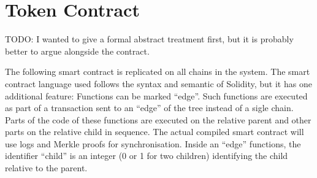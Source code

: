 \documentclass[11pt,letterpaper]{article}
\newtheorem{property}[dummytheorem]{Property}
\begin{document}
\section{Token Contract}

TODO: I wanted to give a formal abstract treatment first,
but it is probably better to argue alongside the contract.






The following smart contract is replicated on all chains in
the system. The smart contract language used follows
the syntax and semantic of Solidity, but it has
one additional feature: Functions can be marked ``edge''.
Such functions
are executed as part of a transaction sent to an ``edge''
of the tree instead of a sigle chain. Parts of the code of these functions
are executed on the relative parent and other parts on
the relative child in sequence. The actual compiled smart contract
will use logs and Merkle proofs for synchronisation.
Inside an ``edge'' functions, the identifier
``child'' is an integer (0 or 1 for two children) identifying the
child relative to the parent.
\end{document}
